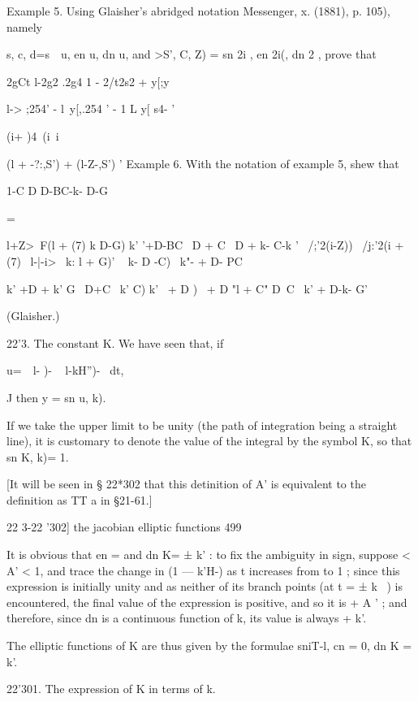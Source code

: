 Example 5. Using Glaisher's abridged notation Messenger, x. (1881), p.
105), namely

s, c, d=s\ \ u, en u, dn u, and >S', C, Z) = sn 2i , en 2i(, dn 2 ,
prove that

2gCt l-2g2 .2g4 1 - 2/t2s2 + y[;y

l-> ;254' - l\ y[,.254 ' - 1 L y[ s4- '

(i+ )4\ (i\ i



(l + -?:,S') + (l-Z-,S') ' Example 6. With the notation of example 5,
shew that

1-C D D-BC-k- D-G



   =



l+Z>~F(l + (7) k D-G) k' '+D-BC \ D + C \ D + k- C-k ' \ /;'2(i-Z)) \
/j:'2(i + (7) ~l-|-i>~ k: l + G)' ~ k- D -C)~ k"- + D- PC

k' +D + k' G \ D+C \ k' C) k' \ + D ) \ + D "l + C" D~C ~k' + D-k- G'



(Glaisher.)



22'3. The constant K. We have seen that, if

u=\ \ l- )- ~ l-kH'')- ~dt,

J then y = sn u, k).

If we take the upper limit to be unity (the path of integration being
a straight line), it is customary to denote the value of the integral
by the symbol K, so that sn K, k)= 1.

[It will be seen in § 22*302 that this detinition of A' is equivalent
to the definition as TT a in §21-61.]



22 3-22 '302] the jacobian elliptic functions 499

It is obvious that en = and dn K= ± k' : to fix the ambiguity in sign,
suppose < A' < 1, and trace the change in (1 — k'H-) as t increases
from to 1 ; since this expression is initially unity and as neither of
its branch points (at t = ± k~ ) is encountered, the final value of
the expression is positive, and so it is + A ' ; and therefore, since
dn is a continuous function of k, its value is always + k'.

The elliptic functions of K are thus given by the formulae sniT-l, cn
= 0, dn K = k'.

22'301. The expression of K in terms of k.

